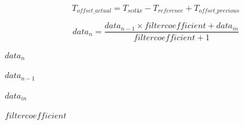 \documentclass{article}
\begin{document}
\[T_{offset\_actual} = T_{scd4x} - T_{reference} + T_{offset\_previous}
\]
\pagebreak

\[  data_n = \frac{data_{n-1} \times filtercoefficient + data_{in}}{filtercoefficient + 1}
\]
\pagebreak

$ data_n $
\pagebreak

$ data_{n-1} $
\pagebreak

$ data_{in} $
\pagebreak

$ filtercoefficient $
\pagebreak
\end{document}
